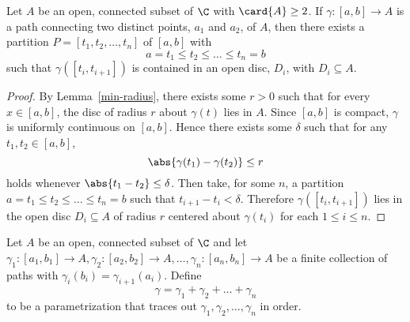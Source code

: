 \documentclass[12pt]{amsart}
\begin{document}
\begin{lem}\label{partition}
  Let $A$ be an open, connected subset of $\C$ with $\card{A} \geq 2$.
  If $\gamma \colon [a, b] \rightarrow A$ is a path connecting two distinct points, $a_1$ and $a_2$, of $A$, then there exists a partition $P = [t_1, t_2, \ldots, t_n]$ of $[a,b]$ with
  $$a = t_1 \leq t_2 \leq \ldots \leq t_n = b$$
  such that $\gamma([t_i, t_{i+1}])$ is contained in an open disc, $D_i$, with $D_i \subseteq A$.
  \begin{proof}
    By Lemma~\ref{min-radius}, there exists some $r > 0$ such that for every $x \in [a,b]$, the disc of radius $r$ about $\gamma(t)$ lies in $A$.
    Since $[a,b]$ is compact, $\gamma$ is uniformly continuous on $[a,b]$.
    Hence there exists some $\delta$ such that for any $t_1, t_2 \in [a,b]$, $$\abs{\gamma(t_1) - \gamma(t_2)} \leq r$$ holds whenever $\abs{t_1 - t_2} \leq \delta$.
    Then take, for some $n$, a partition $a = t_1 \leq t_2 \leq \ldots \leq t_n = b$ such that $t_{i+1} - t_i < \delta$.
    Therefore $\gamma([t_i, t_{i+1}])$ lies in the open disc $D_i \subseteq A$ of radius $r$ centered about $\gamma(t_i)$ for each $1 \leq i \leq n$.
  \end{proof}
\end{lem}

\begin{defn}
  Let $A$ be an open, connected subset of $\C$ and let $\gamma_1 \colon [a_1,b_1] \rightarrow A, \gamma_2 \colon [a_2,b_2] \rightarrow A, \ldots, \gamma_n \colon [a_n,b_n] \rightarrow A$ be a finite collection of paths with $\gamma_i(b_i) = \gamma_{i+1}(a_i)$.
  Define $$\gamma = \gamma_1 + \gamma_2 + \ldots + \gamma_n$$ to be a parametrization that traces out $\gamma_1, \gamma_2, \ldots, \gamma_n$ in order.
\end{defn}
\end{document}
